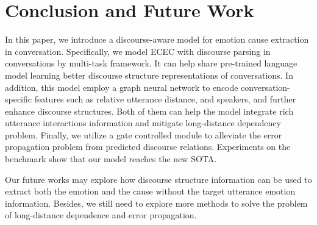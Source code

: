 \documentclass[11pt]{article}
\begin{document}
\section{Conclusion and Future Work}\label{sec:conclusion}
In this paper, we introduce a discourse-aware model for emotion cause extraction in conversation.
Specifically, we model ECEC with discourse parsing in conversations by multi-task framework.
It can help share pre-trained language model learning better discourse structure representations of conversations. 
In addition, this model employ a graph neural network to encode conversation-specific features such as relative utterance distance, and speakers, and further enhance discourse structures.
Both of them can help the model integrate rich utterance interactions information and mitigate long-distance dependency problem.
Finally, we utilize a gate controlled module to alleviate the error propagation problem from predicted discourse relations.
Experiments on the benchmark show that our model reaches the new SOTA.

Our future works may explore how discourse structure information can be used to extract both the emotion and the cause without the target utterance emotion information.
Besides, we still need to explore more methods to solve the problem of long-distance dependence and error propagation.




\end{document}
